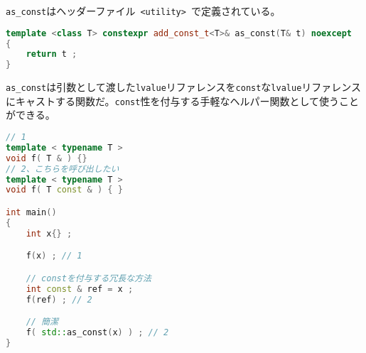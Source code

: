%

\lstinline!as_const!はヘッダーファイル~\lstinline!<utility>!~で定義されている。

\begin{lstlisting}[language=C++]
template <class T> constexpr add_const_t<T>& as_const(T& t) noexcept
{
    return t ;
}
\end{lstlisting}

\lstinline!as_const!は引数として渡した\lstinline!lvalue!リファレンスを\lstinline!const!な\lstinline!lvalue!リファレンスにキャストする関数だ。\lstinline!const!性を付与する手軽なヘルパー関数として使うことができる。

\begin{lstlisting}[language=C++]
// 1
template < typename T >
void f( T & ) {}
// 2、こちらを呼び出したい
template < typename T >
void f( T const & ) { }

int main()
{
    int x{} ;

    f(x) ; // 1

    // constを付与する冗長な方法
    int const & ref = x ;
    f(ref) ; // 2

    // 簡潔
    f( std::as_const(x) ) ; // 2
}
\end{lstlisting}

